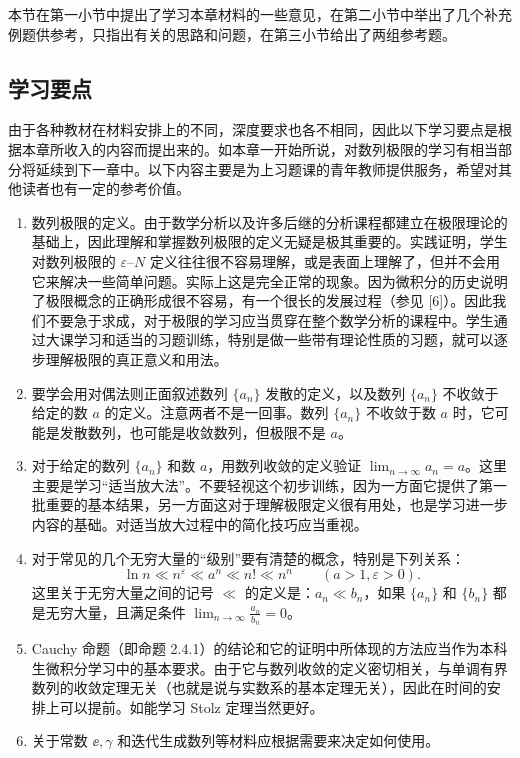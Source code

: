 本节在第一小节中提出了学习本章材料的一些意见，在第二小节中举出了几个补充例题供参考，只指出有关的思路和问题，在第三小节给出了两组参考题。

\subsection{学习要点}

由于各种教材在材料安排上的不同，深度要求也各不相同，因此以下学习要点是根据本章所收入的内容而提出来的。如本章一开始所说，对数列极限的学习有相当部分将延续到下一章中。以下内容主要是为上习题课的青年教师提供服务，希望对其他读者也有一定的参考价值。

\begin{enumerate}[label=\arabic*.]
  \item 数列极限的定义。由于数学分析以及许多后继的分析课程都建立在极限理论的基础上，因此理解和掌握数列极限的定义无疑是极其重要的。实践证明，学生对数列极限的 $\varepsilon$--$N$ 定义往往很不容易理解，或是表面上理解了，但并不会用它来解决一些简单问题。实际上这是完全正常的现象。因为微积分的历史说明了极限概念的正确形成很不容易，有一个很长的发展过程（参见 [6]）。因此我们不要急于求成，对于极限的学习应当贯穿在整个数学分析的课程中。学生通过大课学习和适当的习题训练，特别是做一些带有理论性质的习题，就可以逐步理解极限的真正意义和用法。
  \item 要学会用对偶法则正面叙述数列 $\{a_n\}$ 发散的定义，以及数列 $\{a_n\}$ 不收敛于给定的数 $a$ 的定义。注意两者不是一回事。数列 $\{a_n\}$ 不收敛于数 $a$ 时，它可能是发散数列，也可能是收敛数列，但极限不是 $a$。
  \item 对于给定的数列 $\{a_n\}$ 和数 $a$，用数列收敛的定义验证 $\displaystyle\lim_{n\to\infty}a_n=a$。这里主要是学习“适当放大法”。不要轻视这个初步训练，因为一方面它提供了第一批重要的基本结果，另一方面这对于理解极限定义很有用处，也是学习进一步内容的基础。对适当放大过程中的简化技巧应当重视。
  \item 对于常见的几个无穷大量的“级别”要有清楚的概念，特别是下列关系：
  \[
    \ln n\ll n^\varepsilon\ll a^n\ll n!\ll n^n
    \qquad(a>1,\varepsilon>0).
  \]
  这里关于无穷大量之间的记号 $\ll$ 的定义是：$a_n\ll b_n$，如果 $\{a_n\}$ 和 $\{b_n\}$ 都是无穷大量，且满足条件 $\displaystyle\lim_{n\to\infty}\frac{a_n}{b_n}=0$。
  \item Cauchy 命题（即命题 2.4.1）的结论和它的证明中所体现的方法应当作为本科生微积分学习中的基本要求。由于它与数列收敛的定义密切相关，与单调有界数列的收敛定理无关（也就是说与实数系的基本定理无关），因此在时间的安排上可以提前。如能学习 Stolz 定理当然更好。
  \item 关于常数 $\ee,\gamma$ 和迭代生成数列等材料应根据需要来决定如何使用。
\end{enumerate}

